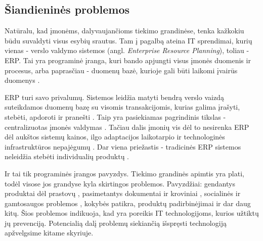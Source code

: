 
\subsection{Šiandieninės problemos}

Natūralu, kad įmonėms, dalyvaujančioms tiekimo grandinėse, tenka kažkokiu būdu suvaldyti visus esybių srautus. Tam į pagalbą ateina IT sprendimai, kurių vienas - verslo valdymo sistemos (angl. \textit{Enterprise Resource Planning}), toliau - ERP. Tai yra programinė įranga, kuri bando apjungti visus įmonės duomenis ir procesus, arba paprasčiau - duomenų bazė, kurioje gali būti laikomi įvairūs duomenys \cite{ozcan2016software}. 

ERP turi savo privalumų. Sistemos leidžia matyti bendrą verslo vaizdą suteikdamos duomenų bazę su visomis transakcijomis, kurias galima įrašyti, stebėti, apdoroti ir pranešti \cite{neubert2018collaboration}. Taip yra pasiekiamas pagrindinis tikslas - centralizuotas įmonės valdymas \cite{ozcan2016software}. Tačiau dalis įmonių vis dėl to nesirenka ERP dėl aukštos sistemų kainos, ilgo adaptacijos laikotarpio ir technologinės infrastruktūros nepajėgumų \cite{ozcan2016software}. Dar viena priežastis - tradicinės ERP sistemos neleidžia stebėti individualių produktų \cite{garg2018supply}. 

Ir tai tik programinės įrangos pavyzdys. Tiekimo grandinės apimtis yra plati, todėl visose jos grandyse kyla skirtingos problemos. Pavyzdžiai: gendantys produktai dėl prastovų \cite{briano2010resiliency}, pasimetantys dokumentai ir kroviniai \cite{huber2007vendor}, socialinės ir gamtosaugos problemos \cite{mani2015supply} \cite{vachon2006extending}, kokybės patikra, produktų padirbinėjimai \cite{huber2007vendor} ir dar daug kitų. Šios problemos indikuoja, kad yra poreikis IT technologijoms, kurios užtiktų jų prevenciją. Potencialią dalį problemų siekiančią išspręsti technologiją apžvelgsime kitame skyriuje.